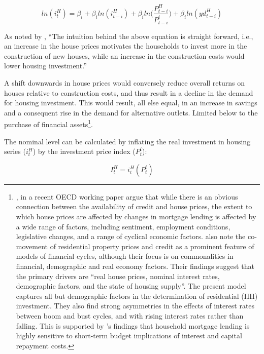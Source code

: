 \documentclass[
]{book}
\begin{document}
\begin{equation}
ln(i^H_t) = \beta _i + \beta _i ln(i^H_{t-i}) + \beta _i ln \Bigg( \frac{P^H_{t-i}}{P^i_{t-i}}\Bigg) + \beta _iln(yd^H_{t-i})
\label{eq:housing-hh}
\end{equation}

As noted by \citet[pp.~20]{byrialsenraza2019empirical}, ``The intuition behind the above equation is straight forward, i.e., an increase in the house prices motivates the households to invest more in the construction of new houses, while an increase in the construction costs would lower housing investment.''

A shift downwards in house prices would conversely reduce overall returns on houses relative to
construction costs, and thus result in a decline in the demand for housing investment.
This would result, all else equal, in an increase in savings and a consequent rise in the demand
for alternative outlets. Limited below to the purchase of financial assets\footnote{\citet{andre2016household}, in a recent OECD working paper argue that while there is an
  obvious connection between the availability of credit and house prices, the extent to which
  house prices are affected by changes in mortgage lending is affected by a wide range of
  factors, including sentiment, employment conditions, legislative changes, and a range of cyclical
  economic factors. \citet{kohlscheen2018residential} also note the co-movement of residential property
  prices and credit as a prominent feature of models of financial cycles, although their focus is
  on commonalities in financial, demographic and real economy factors. Their
  \citep[pp.~2]{kohlscheen2018residential} findings suggest that the primary drivers are
  ``real house prices, nominal interest rates, demographic factors, and the state of housing supply''.
  The present model captures all but demographic factors in the determination of residential (HH)
  investment. They also find strong asymmetries in the effects of interest rates between boom and
  bust cycles, and with rising interest rates rather than falling. This is supported by \citet{scanlon2008}'s
  findings that household mortgage lending is highly sensitive to short-term budget
  implications of interest and capital repayment costs.}.

The nominal level can be calculated by inflating the real investment in housing
series (\(i^H_t\)) by the investment price index (\(P^i_t\)):

\begin{equation}
I^H_t = i^H_t(P^i_t)
\end{equation}
\end{document}

